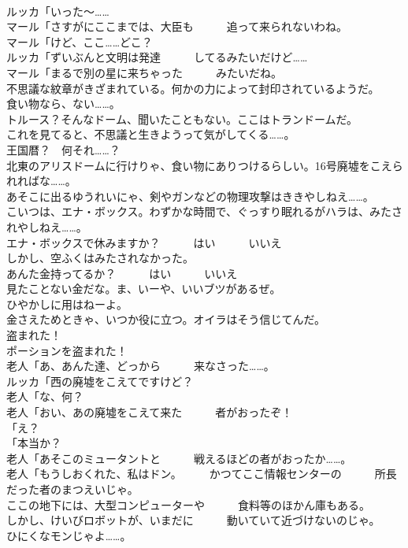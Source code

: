 \documentclass[8pt]{extreport}
\begin{document}
\begin{CJK}{UTF8}{min}
\\	ルッカ「いった～……	
\\	マール「さすがにここまでは、大臣も　　　追って来られないわね。	
\\	マール「けど、ここ……どこ？	
\\	ルッカ「ずいぶんと文明は発達　　　してるみたいだけど……	
\\	マール「まるで別の星に来ちゃった　　　みたいだね。	
\\	不思議な紋章がきざまれている。何かの力によって封印されているようだ。	
\\	食い物なら、ない……。	
\\	トルース？そんなドーム、聞いたこともない。ここはトランドームだ。	
\\	これを見てると、不思議と生きようって気がしてくる……。	
\\	王国暦？　何それ……？	
\\	北東のアリスドームに行けりゃ、食い物にありつけるらしい。16号廃墟をこえられればな……。	
\\	あそこに出るゆうれいにゃ、剣やガンなどの物理攻撃はききやしねえ……。	
\\	こいつは、エナ・ボックス。わずかな時間で、ぐっすり眠れるがハラは、みたされやしねえ……。	
\\	エナ・ボックスで休みますか？　　　はい　　　いいえ	
\\	しかし、空ふくはみたされなかった。	
\\	あんた金持ってるか？　　　はい　　　いいえ	
\\	見たことない金だな。ま、いーや、いいブツがあるぜ。	
\\	ひやかしに用はねーよ。	
\\	金さえためときゃ、いつか役に立つ。オイラはそう信じてんだ。	
\\	盗まれた！	
\\	ポーションを盗まれた！	
\\	老人「あ、あんた達、どっから　　　来なさった……。	
\\	ルッカ「西の廃墟をこえてですけど？	
\\	老人「な、何？	
\\	老人「おい、あの廃墟をこえて来た　　　者がおったぞ！	
\\	「え？	
\\	「本当か？	
\\	老人「あそこのミュータントと　　　戦えるほどの者がおったか……。	
\\	老人「もうしおくれた、私はドン。　　　かつてここ情報センターの　　　所長だった者のまつえいじゃ。	
\\	ここの地下には、大型コンピューターや　　　食料等のほかん庫もある。　　　しかし、けいびロボットが、いまだに　　　動いていて近づけないのじゃ。　　　ひにくなモンじゃよ……。	

\end{CJK}
\end{document}
